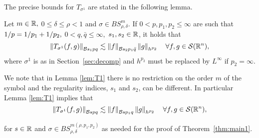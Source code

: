 The precise bounds for $T_{\sigma^1}$ are stated in the following lemma.

\begin{lemma}\label{lem:T1} Let $m \in \mathbb{R},$  $0 \le \delta\le  \rho < 1$ and $\sigma \in BS^m_{\rho, \delta}$. If   $0<p,p_1,p_2\le \infty$ are such that $1/p=1/p_1+1/p_2,$ $0 < q ,\bar{q}\leq \infty,$ $s_1, s_2 \in \mathbb{R}$, it holds that
\begin{equation}\label{eq:estT1}
\left\|T_{\sigma^1}(f,g)\right\|_{\mathcal{B}{s_1}{p}{q}}  \lesssim \left\|f\right\|_{\mathcal{B}{s_2}{p_1}{\bar{q}}} \left\|g\right\|_{h^{p_2}} \quad \forall f, g \in {\mathcal{S}}({{\mathbb R}^n}),
\end{equation}
where $\sigma^1$ is as in Section~\ref{sec:decomp} and $h^{p_2}$ must be replaced by $L^\infty$ if $p_2=\infty.$
\end{lemma}


We note that in Lemma \ref{lem:T1} there is no restriction on the order $m$ of the symbol and the regularity indices, $s_1$ and $s_2$, can be different. In particular Lemma \ref{lem:T1} implies that 
$$\left\|T_{\sigma^1}(f,g)\right\|_{\mathcal{B}{s}{p}{q}}  \lesssim \left\|f\right\|_{\mathcal{B}{s}{p_1}{q}} \left\|g\right\|_{h^{p_2}} \quad \forall f, g \in {\mathcal{S}}({{\mathbb R}^n}),$$

for $s\in\mathbb{R}$ and $\sigma\in BS^{m(\rho,p_1,p_2)}_{\rho,\delta}$ as needed for the proof of Theorem~\ref{thm:main1}.



